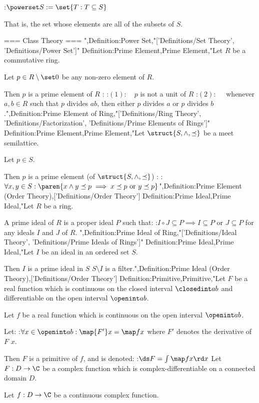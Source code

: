 :$\powerset S := \set {T: T \subseteq S}$

That is, the set whose elements are all of the subsets of $S$.


=== Class Theory ===
",Definition:Power Set,"['Definitions/Set Theory', 'Definitions/Power Set']"
Definition:Prime Element,Prime Element,"Let $R$ be a commutative ring.

Let $p \in R \setminus \set 0$ be any non-zero element of $R$.


Then $p$ is a prime element of $R$ :
:$(1): \quad p$ is not a unit of $R$ 
:$(2): \quad$ whenever $a, b \in R$ such that $p$ divides $a b$, then either $p$ divides $a$ or $p$ divides $b$.",Definition:Prime Element of Ring,"['Definitions/Ring Theory', 'Definitions/Factorization', 'Definitions/Prime Elements of Rings']"
Definition:Prime Element,Prime Element,"Let $\struct {S, \wedge, \preceq}$ be a meet semilattice.

Let $p \in S$.


Then $p$ is a prime element (of $\struct {S, \wedge, \preceq}$) :
:$\forall x, y \in S: \paren {x \wedge y \preceq p \implies x \preceq p \text { or } y \preceq p}$",Definition:Prime Element (Order Theory),['Definitions/Order Theory']
Definition:Prime Ideal,Prime Ideal,"Let $R$ be a ring.


A prime ideal of $R$ is a proper ideal $P$ such that:
:$I \circ J \subseteq P \implies I \subseteq P \text { or } J \subseteq P$
for any ideals $I$ and $J$ of $R$.
",Definition:Prime Ideal of Ring,"['Definitions/Ideal Theory', 'Definitions/Prime Ideals of Rings']"
Definition:Prime Ideal,Prime Ideal,"Let $I$ be an ideal in an ordered set $S$.


Then $I$ is a prime ideal in $S$  $S \setminus I$ is a filter.",Definition:Prime Ideal (Order Theory),['Definitions/Order Theory']
Definition:Primitive,Primitive,"Let $F$ be a real function which is continuous on the closed interval $\closedint a b$ and differentiable on the open interval $\openint a b$.

Let $f$ be a real function which is continuous on the open interval $\openint a b$.


Let:
:$\forall x \in \openint a b: \map {F'} x = \map f x$
where $F'$ denotes the derivative of $F$  $x$.


Then $F$ is a primitive of $f$, and is denoted:
:$\ds F = \int \map f x \rd x$
Let $F: D \to \C$ be a complex function which is complex-differentiable on a connected domain $D$.

Let $f: D \to \C$ be a continuous complex function.


